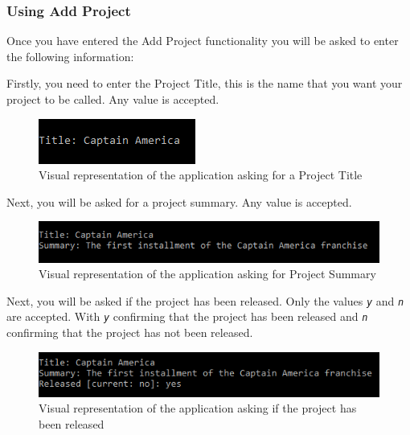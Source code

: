 \documentclass[
  english,
  a4paper,
,tablecaptionabove
]{scrartcl}
\begin{document}
\newpage

\hypertarget{using-add-project}{%
\subsubsection{Using Add Project}\label{using-add-project}}

Once you have entered the Add Project functionality you will be asked to
enter the following information:

Firstly, you need to enter the Project Title, this is the name that you
want your project to be called. Any value is accepted.

\begin{figure}
\centering
\includegraphics{images/user-guide/maintenance-mode/add-project-title.png}
\caption{Visual representation of the application asking for a Project
Title}
\end{figure}

Next, you will be asked for a project summary. Any value is accepted.

\begin{figure}
\centering
\includegraphics{images/user-guide/maintenance-mode/add-project-summary.png}
\caption{Visual representation of the application asking for Project
Summary}
\end{figure}

Next, you will be asked if the project has been released. Only the
values \emph{\texttt{y}} and \emph{\texttt{n}} are accepted. With
\emph{\texttt{y}} confirming that the project has been released and
\emph{\texttt{n}} confirming that the project has not been released.

\begin{figure}
\centering
\includegraphics{images/user-guide/maintenance-mode/add-project-released.png}
\caption{Visual representation of the application asking if the project
has been released}
\end{figure}
\end{document}
